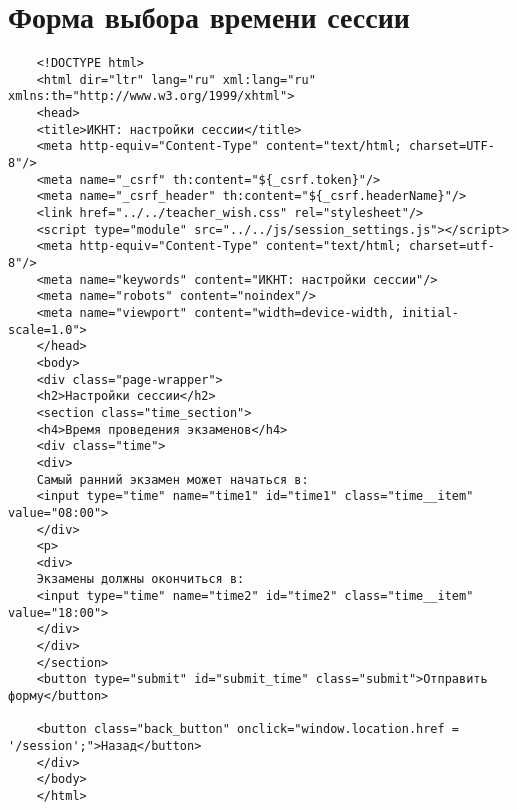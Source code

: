 \chapter{Форма выбора времени сессии}\label{appendix-time}	

\begin{lstlisting}
	<!DOCTYPE html>
	<html dir="ltr" lang="ru" xml:lang="ru" xmlns:th="http://www.w3.org/1999/xhtml">
	<head>
	<title>ИКНТ: настройки сессии</title>
	<meta http-equiv="Content-Type" content="text/html; charset=UTF-8"/>
	<meta name="_csrf" th:content="${_csrf.token}"/>
	<meta name="_csrf_header" th:content="${_csrf.headerName}"/>
	<link href="../../teacher_wish.css" rel="stylesheet"/>
	<script type="module" src="../../js/session_settings.js"></script>
	<meta http-equiv="Content-Type" content="text/html; charset=utf-8"/>
	<meta name="keywords" content="ИКНТ: настройки сессии"/>
	<meta name="robots" content="noindex"/>
	<meta name="viewport" content="width=device-width, initial-scale=1.0">
	</head>
	<body>
	<div class="page-wrapper">
	<h2>Настройки сессии</h2>
	<section class="time_section">
	<h4>Время проведения экзаменов</h4>
	<div class="time">
	<div>
	Самый ранний экзамен может начаться в:
	<input type="time" name="time1" id="time1" class="time__item" value="08:00">
	</div>
	<p>
	<div>
	Экзамены должны окончиться в:
	<input type="time" name="time2" id="time2" class="time__item" value="18:00">
	</div>
	</div>
	</section>
	<button type="submit" id="submit_time" class="submit">Отправить форму</button>
	
	<button class="back_button" onclick="window.location.href = '/session';">Назад</button>
	</div>
	</body>
	</html>
\end{lstlisting}